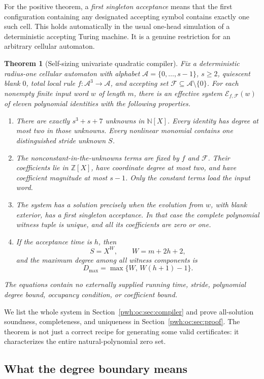 \documentclass[11pt,letterpaper]{article}
\numberwithin{equation}{section}
\newtheorem{theorem}{Theorem}[section]
\theoremstyle{definition}
\newcommand{\N}{\mathbb N}
\newcommand{\Z}{\mathbb Z}
\newcommand{\A}{\mathcal A}
\newcommand{\F}{\mathcal F}
\newcommand{\Sys}{\mathcal E_{f,\F}(w)}
\begin{document}
For the positive theorem, a \emph{first singleton acceptance} means that the
first configuration containing any designated accepting symbol contains
exactly one such cell. This holds automatically in the usual one-head
simulation of a deterministic accepting Turing machine. It is a genuine
restriction for an arbitrary cellular automaton.

\begin{theorem}[Self-sizing univariate quadratic compiler]
\label{pwh:oc:thm:main}
Fix a deterministic radius-one cellular automaton with alphabet
$\A=\{0,\ldots,s-1\}$, $s\ge2$, quiescent blank $0$, total local rule
$f:\A^3\to\A$, and accepting set $\F\subseteq\A\setminus\{0\}$.
For each nonempty finite input word $w$ of length $m$, there is an effective
system $\Sys$ of eleven polynomial identities with the following properties.
\begin{enumerate}[label=\textup{(\roman*)}]
\item There are exactly $s^3+s+7$ unknowns in $\N[X]$. Every identity has
      degree at most two in those unknowns. Every nonlinear monomial
      contains one distinguished stride unknown $S$.
\item The nonconstant-in-the-unknowns terms are fixed by $f$ and $\F$.
      Their coefficients lie in $\Z[X]$, have coordinate degree at most
      two, and have coefficient magnitude at most $s-1$. Only the
      constant terms load the input word.
\item The system has a solution precisely when the evolution from $w$,
      with blank exterior, has a first singleton acceptance. In that case
      the complete polynomial witness tuple is unique, and all its
      coefficients are zero or one.
\item If the acceptance time is $h$, then
\[
 S=X^W,\qquad W=m+2h+2,
\]
      and the maximum degree among all witness components is
\[
 D_{\max}=\max\{W,\,W(h+1)-1\}.
\]
\end{enumerate}
The equations contain no externally supplied running time, stride,
polynomial degree bound, occupancy condition, or coefficient bound.
\end{theorem}

We list the whole system in Section~\ref{pwh:oc:sec:compiler} and prove all-solution
soundness, completeness, and uniqueness in Section~\ref{pwh:oc:sec:proof}.
The theorem is not just a correct recipe for generating some valid
certificates: it characterizes the entire natural-polynomial zero set.

\subsection{What the degree boundary means}
\end{document}
